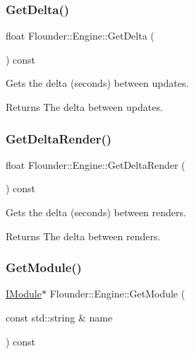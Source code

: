 \subsubsection{\texorpdfstring{Get\+Delta()}{GetDelta()}}
{\footnotesize\ttfamily float Flounder\+::\+Engine\+::\+Get\+Delta (\begin{DoxyParamCaption}{ }\end{DoxyParamCaption}) const\hspace{0.3cm}{\ttfamily [inline]}}



Gets the delta (seconds) between updates. 

\begin{DoxyReturn}{Returns}
The delta between updates. 
\end{DoxyReturn}
\mbox{\label{class_flounder_1_1_engine_a15e8c8c2a39b23c1e9e83f6915784f31}} 
\subsubsection{\texorpdfstring{Get\+Delta\+Render()}{GetDeltaRender()}}
{\footnotesize\ttfamily float Flounder\+::\+Engine\+::\+Get\+Delta\+Render (\begin{DoxyParamCaption}{ }\end{DoxyParamCaption}) const\hspace{0.3cm}{\ttfamily [inline]}}



Gets the delta (seconds) between renders. 

\begin{DoxyReturn}{Returns}
The delta between renders. 
\end{DoxyReturn}
\mbox{\label{class_flounder_1_1_engine_ae5e1252b6e36d544e411096f7c27c952}} 
\subsubsection{\texorpdfstring{Get\+Module()}{GetModule()}}
{\footnotesize\ttfamily \hyperlink{class_flounder_1_1_i_module}{I\+Module}$\ast$ Flounder\+::\+Engine\+::\+Get\+Module (\begin{DoxyParamCaption}\item[{const std\+::string \&}]{name }\end{DoxyParamCaption}) const\hspace{0.3cm}{\ttfamily [inline]}}



